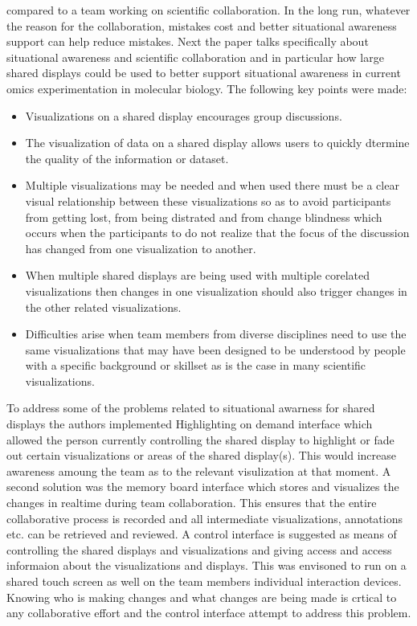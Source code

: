 \documentclass{sig-alternate}
\begin{document}
compared to a team working on scientific collaboration. In the long run,
whatever the reason for the collaboration, mistakes cost and better situational
awareness support can help reduce mistakes. 
Next the paper talks specifically about situational awareness and scientific
collaboration and in particular how large shared displays could be used to 
better support situational awareness in current omics experimentation in 
molecular biology. The following key points were made:
\begin{itemize}
  \item Visualizations on a shared display encourages group discussions.
  \item The visualization of data on a shared display allows users to quickly
  dtermine the quality of the information or dataset.
  \item Multiple visualizations may be needed and when used there must be a
  clear visual relationship between these visualizations so as to avoid
  participants from getting lost, from being distrated and from change blindness
  which occurs when the participants to do not realize that the focus of the
  discussion has changed from one visualization to  another.
  \item When multiple shared displays are being used with multiple
  corelated visualizations then changes in one visualization should also trigger
  changes in the other related visualizations.
  \item Difficulties arise when team members from diverse disciplines need to 
  use the same visualizations that may have been designed to be understood by
  people with a specific background or skillset as is the case in many
  scientific visualizations.
\end{itemize}
To address some of the problems related to situational awarness for shared
displays the authors implemented Highlighting on demand interface which allowed
the person currently controlling the shared display to highlight or fade out
certain visualizations or areas of the shared display(s). This would increase
awareness amoung the team as to the relevant visulization at that moment. A
second solution was the memory board interface which stores and visualizes the 
changes in realtime during team collaboration. This ensures that the entire
collaborative process is recorded and all intermediate visualizations,
annotations etc. can be retrieved and reviewed. A control interface is
suggested as means of controlling the shared displays and visualizations and
giving access and access informaion about the visualizations and displays. This
was envisoned to run on a shared touch screen as well on the team members
individual interaction devices. Knowing who is making changes and what changes
are being made is crtical to any collaborative effort and the control interface
attempt to address this problem.
\end{document}
